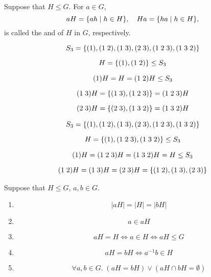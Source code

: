 
\begin{frame}
  \begin{definition}[Coset (陪集))]
    Suppose that $H \le G$.
    For $a \in G$,
    \[
      aH = \{ah \mid h \in H\}, \quad Ha = \{ha \mid h \in H\},
    \]
    is called the 
    and  of $H$ in $G$, respectively.
  \end{definition}
\end{frame}

\begin{frame}
  \[
    S_{3} = \{(1), (1\; 2), (1\; 3), (2\; 3), (1\; 2\; 3), (1\; 3\; 2)\}
  \]

  \[
    H = \{(1), (1\; 2)\} \le S_{3}
  \]

  \pause
  \begin{gather*}
    (1) H = H = (1\; 2) H \le S_{3} \\[6pt]
    (1\; 3) H = \{(1\; 3), (1\; 2\; 3)\} = (1\; 2\; 3)H \\[6pt]
    (2\; 3) H = \{(2\; 3), (1\; 3\; 2)\} = (1\; 3\; 2)H
  \end{gather*}
\end{frame}

\begin{frame}
  \[
    S_{3} = \{(1), (1\; 2), (1\; 3), (2\; 3), (1\; 2\; 3), (1\; 3\; 2)\}
  \]

  \[
    H = \{(1), (1\; 2\; 3), (1\; 3\; 2)\} \le S_{3}
  \]

  \pause
  \begin{gather*}
    (1)H = (1\;2\;3)H = (1\;3\;2)H = H \le S_{3} \\[6pt]
    (1\;2) H = (1\;3)H = (2\;3)H = \{(1\;2), (1\;3), (2\;3)\}
  \end{gather*}
\end{frame}

\begin{frame}{}
  \begin{theorem}
    Suppose that $H \le G$, $a, b \in G$.
    \begin{enumerate}[(1)]
      \item
        \[
          |aH| = |H| = |bH|
        \]
      \item
        \[
          a \in aH
        \]
      \item
        \[
          aH = H \iff a \in H \iff aH \le G
        \]
      \item
        \[
          aH = bH \iff a^{-1}b \in H
        \]
      \item
        \[
          \forall a, b \in G.\; (aH = bH) \lor (aH \cap bH = \emptyset)
        \]
    \end{enumerate}
  \end{theorem}
\end{frame}

